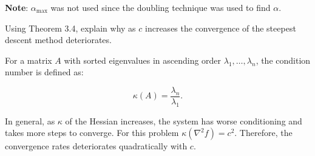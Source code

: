 \noindent
\textbf{Note}: $\alpha_{\max}$ was not used since the doubling technique was used to find $\alpha$.



\newpage 
\begin{subproblem}
  Using Theorem 3.4, explain why as $c$ increases the convergence of the steepest descent method deteriorates.
\end{subproblem}

For a matrix $A$ with sorted eigenvalues in ascending order $\lambda_1,\ldots,\lambda_n$, the condition number is defined as:

\[ \kappa(A) =\frac{\lambda_n}{\lambda_1} \text{.}\]

\noindent
In general, as $\kappa$ of the Hessian increases, the system has worse conditioning and takes more steps to converge.  For this problem $\kappa(\nabla^2 f) = c^2$.  Therefore, the convergence rates deteriorates quadratically with $c$.